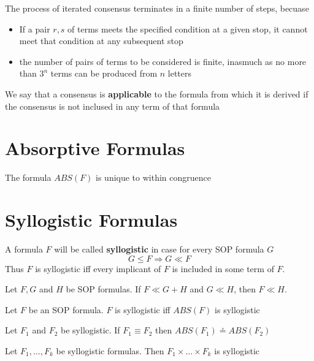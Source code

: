 \documentclass[11pt]{article}
\def \ceq {\overset{\circ}{=}}
\begin{document}
The process of iterated consensus terminates in a finite number of steps,
becuase
\begin{itemize}
\item If a pair \(r,s\) of terms meets the specified condition at a given stop,
it cannot meet that condition at any subsequent stop
\item the number of pairs of terms to be considered is finite, inasmuch as no
more than \(3^n\) terms can be produced from \(n\) letters
\end{itemize}


We say that a consensus is \textbf{applicable} to the formula from which it is derived
if the consensus is not inclused in any term of that formula


\appendix

\section{Absorptive Formulas}
\label{sec:org5cc6c6e}
\begin{lemma}[]
The formula \(ABS(F)\) is unique to within congruence
\end{lemma}

\section{Syllogistic Formulas}
\label{sec:orge0608b4}
   A formula \(F\) will be called \textbf{syllogistic} in case for every SOP
formula \(G\)
\begin{equation*}
G\le F\Rightarrow G\ll F
\end{equation*}
Thus \(F\) is syllogistic iff every implicant of \(F\) is included in some
term of \(F\).

\begin{lemma}[]
Let \(F,G\) and \(H\) be SOP formulas. If \(F\ll G+H\) and \(G\ll H\),
then \(F\ll H\).
\end{lemma}

\begin{lemma}[]
Let \(F\) be an SOP formula. \(F\) is syllogistic iff \(ABS(F)\) is syllogistic
\end{lemma}

\begin{lemma}[]
Let \(F_1\) and \(F_2\) be syllogistic. If \(F_1\equiv F_2\)
then \(ABS(F_1)\ceq ABS(F_2)\)
\end{lemma}

\begin{theorem}[]
\label{thma-2-1}
Let \(F_1,\dots,F_k\) be syllogistic formulas.
Then \(F_1\times\dots\times F_k\) is syllogistic
\end{theorem}
\end{document}
